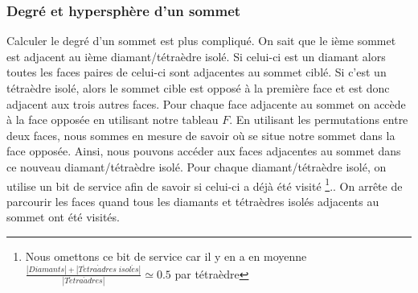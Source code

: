 \documentclass[a4paper,11pt,openany]{article}
\begin{document}
\subsubsection{Degré et hypersphère d'un sommet}
\noindent
Calculer le degré d'un sommet est plus compliqué. On sait que le ième sommet est adjacent au ième diamant/tétraèdre isolé. Si celui-ci est un diamant alors toutes les faces paires de celui-ci sont adjacentes au sommet ciblé. Si c'est un tétraèdre isolé, alors le sommet cible est opposé à la première face et est donc adjacent aux trois autres faces. Pour chaque face adjacente au sommet on accède à la face opposée en utilisant notre tableau $F$. En utilisant les permutations entre deux faces, nous sommes en mesure de savoir où se situe notre sommet dans la face opposée. Ainsi, nous pouvons accéder aux faces adjacentes au sommet dans ce nouveau diamant/tétraèdre isolé. Pour chaque diamant/tétraèdre isolé, on utilise un bit de service afin de savoir si celui-ci a déjà été visité \footnote{Nous omettons ce bit de service car il y en a en moyenne $\frac{|Diamants| + |T\acute{e}tra\grave{a}dres \; isol\acute{e}s|}{|T\acute{e}tra\grave{a}dres|}\simeq 0.5$ par tétraèdre}.. On arrête de parcourir les faces quand tous les diamants et tétraèdres isolés adjacents au sommet ont été visités.
\end{document}
